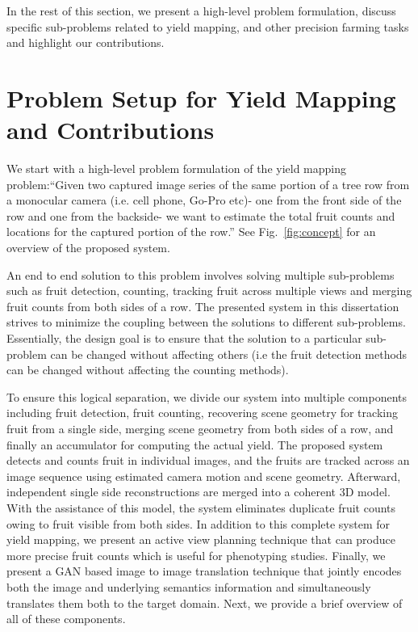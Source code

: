 In the rest of this section, we present a high-level problem formulation, discuss specific sub-problems related to yield mapping, and other precision farming tasks and highlight our contributions.




\section{Problem Setup for Yield Mapping and Contributions }

We start with a high-level problem formulation of the yield mapping problem:``Given two captured image series of the same portion of a tree row from a monocular camera (i.e. cell phone, Go-Pro etc)- one from the front side of the row and one from the backside- we want to estimate the total fruit counts and locations for the captured portion of the row.'' See Fig.~\ref{fig:concept} for an overview of the proposed system.

%

An end to end solution to this problem involves solving multiple sub-problems such as fruit detection, counting, tracking fruit across multiple views and merging fruit counts from both sides of a row. The presented system in this dissertation strives to minimize the coupling between the solutions to different sub-problems. Essentially, the design goal is to ensure that the solution to a particular sub-problem can be changed without affecting others (i.e the fruit detection methods can be changed without affecting the counting methods). 

To ensure this logical separation, we divide our system into multiple components including fruit detection, fruit counting, recovering scene geometry for tracking fruit from a single side, merging scene geometry from both sides of a row, and finally an accumulator for computing the actual yield. The proposed system detects and counts fruit in individual images, and the fruits are tracked across an image sequence using estimated camera motion and scene geometry. Afterward, independent single side reconstructions are merged into a coherent 3D model. With the assistance of this model, the system eliminates duplicate fruit counts owing to fruit visible from both sides. In addition to this complete system for yield mapping, we present an active view planning technique that can produce more precise fruit counts which is useful for phenotyping studies. Finally, we present a GAN based image to image translation technique that jointly encodes both the image and underlying semantics information and simultaneously translates them both to the target domain. Next, we provide a brief overview of all of these components.

